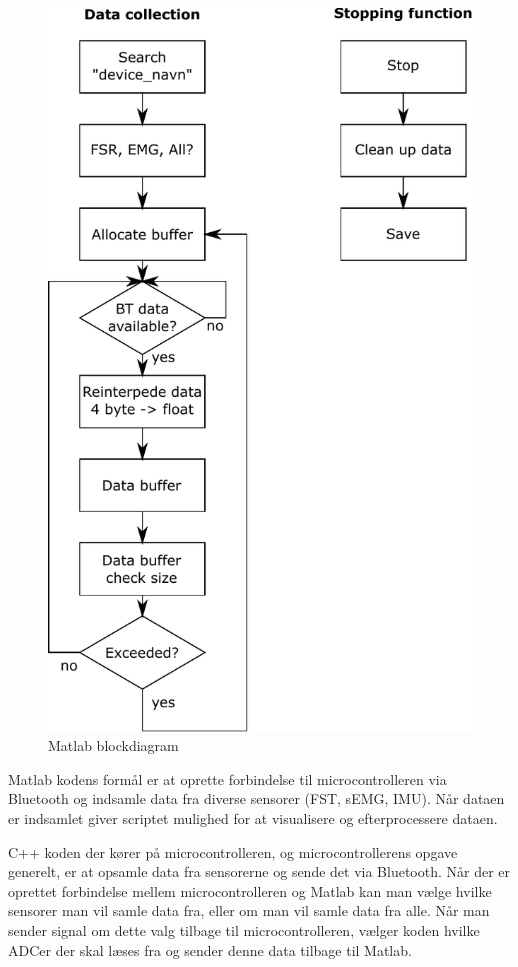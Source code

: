 \begin{figure}[H]
	\centering
	\includegraphics[scale=0.6]{../../Pictures/matlab_block_diagram.pdf}
	\caption{Matlab blockdiagram}
	\label{fig:matlab_block}
\end{figure}

Matlab kodens formål er at oprette forbindelse til microcontrolleren via Bluetooth og indsamle data fra diverse sensorer (FST, sEMG, IMU). Når dataen er indsamlet giver scriptet mulighed for at visualisere og efterprocessere dataen.

C++ koden der kører på microcontrolleren, og microcontrollerens opgave generelt, er at opsamle data fra sensorerne og sende det via Bluetooth. Når der er oprettet forbindelse mellem microcontrolleren og Matlab kan man vælge hvilke sensorer man vil samle data fra, eller om man vil samle data fra alle. Når man sender signal om dette valg tilbage til microcontrolleren, vælger koden hvilke ADCer der skal læses fra og sender denne data tilbage til Matlab.  


